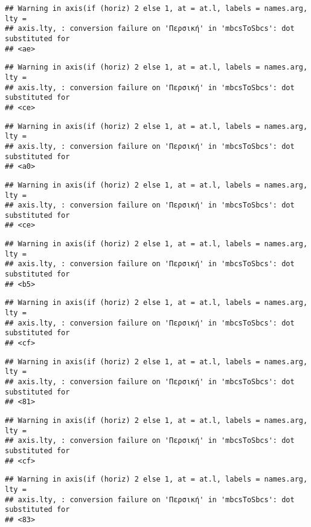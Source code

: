 \documentclass[
]{article}
\begin{document}
\begin{verbatim}
## Warning in axis(if (horiz) 2 else 1, at = at.l, labels = names.arg, lty =
## axis.lty, : conversion failure on 'Περσική' in 'mbcsToSbcs': dot substituted for
## <ae>
\end{verbatim}

\begin{verbatim}
## Warning in axis(if (horiz) 2 else 1, at = at.l, labels = names.arg, lty =
## axis.lty, : conversion failure on 'Περσική' in 'mbcsToSbcs': dot substituted for
## <ce>
\end{verbatim}

\begin{verbatim}
## Warning in axis(if (horiz) 2 else 1, at = at.l, labels = names.arg, lty =
## axis.lty, : conversion failure on 'Περσική' in 'mbcsToSbcs': dot substituted for
## <a0>
\end{verbatim}

\begin{verbatim}
## Warning in axis(if (horiz) 2 else 1, at = at.l, labels = names.arg, lty =
## axis.lty, : conversion failure on 'Περσική' in 'mbcsToSbcs': dot substituted for
## <ce>
\end{verbatim}

\begin{verbatim}
## Warning in axis(if (horiz) 2 else 1, at = at.l, labels = names.arg, lty =
## axis.lty, : conversion failure on 'Περσική' in 'mbcsToSbcs': dot substituted for
## <b5>
\end{verbatim}

\begin{verbatim}
## Warning in axis(if (horiz) 2 else 1, at = at.l, labels = names.arg, lty =
## axis.lty, : conversion failure on 'Περσική' in 'mbcsToSbcs': dot substituted for
## <cf>
\end{verbatim}

\begin{verbatim}
## Warning in axis(if (horiz) 2 else 1, at = at.l, labels = names.arg, lty =
## axis.lty, : conversion failure on 'Περσική' in 'mbcsToSbcs': dot substituted for
## <81>
\end{verbatim}

\begin{verbatim}
## Warning in axis(if (horiz) 2 else 1, at = at.l, labels = names.arg, lty =
## axis.lty, : conversion failure on 'Περσική' in 'mbcsToSbcs': dot substituted for
## <cf>
\end{verbatim}

\begin{verbatim}
## Warning in axis(if (horiz) 2 else 1, at = at.l, labels = names.arg, lty =
## axis.lty, : conversion failure on 'Περσική' in 'mbcsToSbcs': dot substituted for
## <83>
\end{verbatim}
\end{document}

